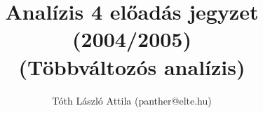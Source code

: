 \documentclass[fleqn,10pt,a4paper,titlepage]{article}
\title{Analízis 4 előadás jegyzet (2004/2005)\\(Többváltozós analízis)}
\author{Tóth László Attila (panther@elte.hu)}
\date{}
\begin{document}
  \maketitle
  \mktoc
  
  \newpage
  
  \newpage
  
\end{document}
